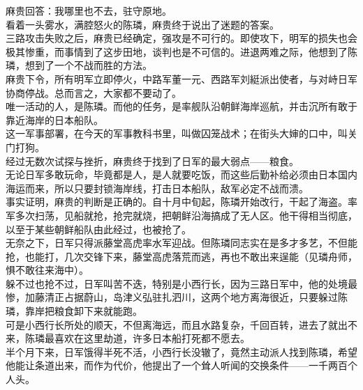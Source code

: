 \begin{multicols}{\theparacolNo}
麻贵回答：我哪里也不去，驻守原地。\\

看着一头雾水，满腔怒火的陈璘，麻贵终于说出了迷题的答案。\\

三路攻击失败之后，麻贵已经确定，强攻是不可行的。即使攻下，明军的损失也会极其惨重，而事情到了这步田地，谈判也是不可信的。进退两难之际，他想到了陈璘，想到了一个不战而胜的方法。\\

麻贵下令，所有明军立即停火，中路军董一元、西路军刘綎派出使者，与对峙日军协商停战。总而言之，大家都不要动了。\\

唯一活动的人，是陈璘。而他的任务，是率舰队沿朝鲜海岸巡航，并击沉所有敢于靠近海岸的日本船队。\\

这一军事部署，在今天的军事教科书里，叫做囚笼战术；在街头大婶的口中，叫关门打狗。\\

经过无数次试探与挫折，麻贵终于找到了日军的最大弱点——粮食。\\

无论日军多敢玩命，毕竟都是人，是人就要吃饭，而这些后勤补给必须由日本国内海运而来，所以只要封锁海岸线，打击日本船队，敌军必定不战而溃。\\

事实证明，麻贵的判断是正确的。自十月中旬起，陈璘开始改行，干起了海盗。率军多次扫荡，见船就抢，抢完就烧，把朝鲜沿海搞成了无人区。他干得相当彻底，以至于某些朝鲜船队由此经过，也被抢了。\\

无奈之下，日军只得派藤堂高虎率水军迎战。但陈璘同志实在是多才多艺，不但能抢，也能打，几次交锋下来，藤堂高虎落荒而逃，再也不敢出来逞能（见璘舟师，惧不敢往来海中）。\\

躲不过也抢不过，日军叫苦不迭，特别是小西行长，因为三路日军中，他的处境最惨，加藤清正占据蔚山，岛津义弘驻扎泗川，这两个地方离海很近，只要躲过陈璘，靠岸把粮食卸下来就能跑。\\

可是小西行长所处的顺天，不但离海远，而且水路复杂，千回百转，进去了就出不来，陈璘最喜欢在这里劫道，许多日本船打死都不愿去。\\

半个月下来，日军饿得半死不活，小西行长没辙了，竟然主动派人找到陈璘，希望他能让条道出来，而作为代价，他提出了一个耸人听闻的交换条件——一千两百个人头。\\


\end{multicols}
